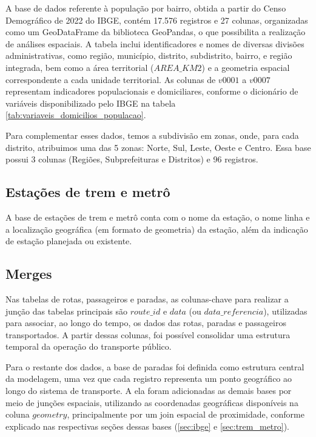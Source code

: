 A base de dados referente à população por bairro, obtida a partir do Censo Demográfico de 2022 do IBGE, contém 17.576 registros e 27 colunas, organizadas como um GeoDataFrame da biblioteca GeoPandas, o que possibilita a realização de análises espaciais. A tabela inclui identificadores e nomes de diversas divisões administrativas, como região, município, distrito, subdistrito, bairro, e região integrada, bem como a área territorial ($AREA\_KM2$) e a geometria espacial correspondente a cada unidade territorial. As colunas de $v0001$ a $v0007$ representam indicadores populacionais e domiciliares, conforme o dicionário de variáveis disponibilizado pelo IBGE na tabela \ref{tab:variaveis_domicilios_populacao}.

Para complementar esses dados, temos a subdivisão em zonas, onde, para cada distrito, atribuimos uma das 5 zonas: Norte, Sul, Leste, Oeste e Centro. Essa base possui 3 colunas (Regiões, Subprefeituras e Distritos) e 96 registros.

\subsection{Estações de trem e metrô}

A base de estações de trem e metrô conta com o nome da estação, o nome linha e a localização geográfica (em formato de geometria) da estação, além da indicação de estação planejada ou existente.

\subsection{Merges}

Nas tabelas de rotas, passageiros e paradas, as colunas-chave para realizar a junção das tabelas principais são $route\_id$ e $data$ (ou $data\_referencia$), utilizadas para associar, ao longo do tempo, os dados das rotas, paradas e passageiros transportados. A partir dessas colunas, foi possível consolidar uma estrutura temporal da operação do transporte público.

Para o restante dos dados, a base de paradas foi definida como estrutura central da modelagem, uma vez que cada registro representa um ponto geográfico ao longo do sistema de transporte. A ela foram adicionadas as demais bases por meio de junções espaciais, utilizando as coordenadas geográficas disponíveis na coluna $geometry$, principalmente por um join espacial de proximidade, conforme explicado nas respectivas seções dessas bases (\ref{sec:ibge} e \ref{sec:trem_metro}).

